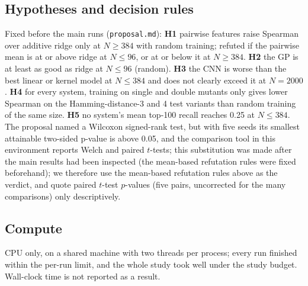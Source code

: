 \subsection{Hypotheses and decision rules}
Fixed before the main runs (\texttt{proposal.md}): \textbf{H1} pairwise features raise Spearman over additive ridge only at $N\ge384$ with random training; refuted if the pairwise mean is at or above ridge at $N\le96$, or at or below it at $N\ge384$. \textbf{H2} the GP is at least as good as ridge at $N\le96$ (random). \textbf{H3} the CNN is worse than the best linear or kernel model at $N\le384$ and does not clearly exceed it at $N{=}2000$. \textbf{H4} for every system, training on single and double mutants only gives lower Spearman on the Hamming-distance-3 and 4 test variants than random training of the same size. \textbf{H5} no system's mean top-100 recall reaches 0.25 at $N\le384$. The proposal named a Wilcoxon signed-rank test, but with five seeds its smallest attainable two-sided p-value is above 0.05, and the comparison tool in this environment reports Welch and paired $t$-tests; this substitution was made after the main results had been inspected (the mean-based refutation rules were fixed beforehand); we therefore use the mean-based refutation rules above as the verdict, and quote paired $t$-test $p$-values (five pairs, uncorrected for the many comparisons) only descriptively.

\subsection{Compute}
CPU only, on a shared machine with two threads per process; every run finished within the per-run limit, and the whole study took well under the study budget. Wall-clock time is not reported as a result.
